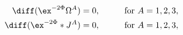 \begin{equation}
\label{sp2cond}
\begin{aligned}
   \diff(\ex^{-2\Phi}\Omega^{A}) &= 0 , \qquad &&\text{for $A=1,2,3$}, \\
   \diff(\ex^{-2\Phi} * J^{A}) &= 0 , \qquad&&\text{for $A=1,2,3$} ,
\end{aligned}
\end{equation}

